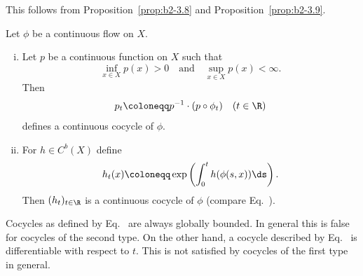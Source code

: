 This follows from Proposition~\ref{prop:b2-3.8} and Proposition~\ref{prop:b2-3.9}.
\begin{example}\label{ex:b2-3.11}
Let $\phi$ be a continuous flow on $X$.
\begin{enumerate}[(i), wide, labelindent=.25em]
\item \label{ex:b2-3.11-1}
Let $p$ be a continuous function on $X$ such that 
%
\[
	\inf_{x \in X} p(x) > 0 \quad \text{and} \quad \sup_{x \in X} p(x) < \infty.
\]
%
Then
\begin{equation}\label{eq:b2-3.13}
p_{t} \coloneqq p^{-1} \cdot (p \circ \phi_{t}) \quad (t \in \R)
\end{equation}
defines a continuous cocycle of\/ $\phi$.
\item \label{ex:b2-3.11-2}
For $h \in C^{b}(X)$ define
\begin{equation}\label{eq:b2-3.14}
h_{t}(x) \coloneqq \exp\left(\int_{0}^{t} h(\phi(s,x))  \ds \right).
\end{equation}
Then $(h_{t})_{t \in \R}$ is a continuous cocycle of\/ $\phi$ (compare Eq.~).
\end{enumerate}
\end{example}
Cocycles as defined by Eq.~ are always globally bounded.
In general this is false for cocycles of the second type.
On the other hand, a cocycle described by Eq.~ is differentiable with respect to $t$.
This is not satisfied by cocycles of the first type in general.

